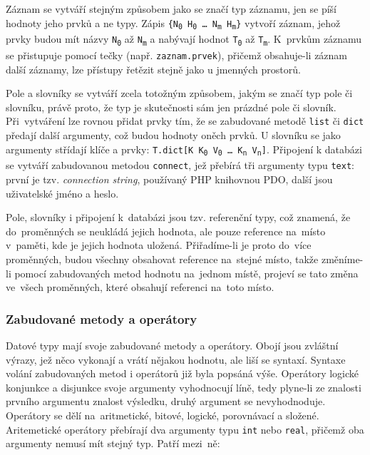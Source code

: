 \documentclass[a4paper,12pt]{article}
\begin{document}
Záznam se vytváří stejným způsobem jako se značí typ záznamu, jen se píší hodnoty jeho prvků a ne typy. Zápis \texttt{\{N\textsubscript{0} H\textsubscript{0} \ldots{} N\textsubscript{m} H\textsubscript{m}\}} vytvoří záznam, jehož prvky budou mít názvy \texttt{N\textsubscript{0}} až \texttt{N\textsubscript{m}} a nabývají hodnot \texttt{T\textsubscript{0}} až \texttt{T\textsubscript{m}}. K~prvkům záznamu se přistupuje pomocí tečky (např. \texttt{zaznam.prvek}), přičemž obsahuje-li záznam další záznamy, lze přístupy řetězit stejně jako u jmenných prostorů.

Pole a slovníky se vytváří zcela totožným způsobem, jakým se značí typ pole či slovníku, právě proto, že typ je skutečnosti sám jen prázdné pole či slovník. Při~vytváření lze rovnou přidat prvky tím, že se zabudované metodě \texttt{list} či \texttt{dict} předají další argumenty, což budou hodnoty oněch prvků. U slovníku se jako argumenty střídají klíče a prvky: \texttt{T.dict[K K\textsubscript{0} V\textsubscript{0} \ldots{} K\textsubscript{n} V\textsubscript{n}]}. Připojení k databázi se vytváří zabudovanou metodou \texttt{connect}, jež přebírá tři argumenty typu \texttt{text}: první je tzv. \textit{connection string}, používaný PHP knihovnou PDO, další jsou uživatelské jméno a heslo.

Pole, slovníky i připojení k~databázi jsou tzv. referenční typy, což znamená, že do~proměnných se neukládá jejich hodnota, ale pouze reference na~místo v~paměti, kde je jejich hodnota uložená. Přiřadíme-li je proto do~více proměnných, budou všechny obsahovat reference na~stejné místo, takže změníme-li pomocí zabudovaných metod hodnotu na~jednom místě, projeví se tato změna ve~všech proměnných, které obsahují referenci na~toto místo.

\subsubsection{Zabudované metody a operátory}
Datové typy mají svoje zabudované metody a operátory. Obojí jsou zvláštní výrazy, jež něco vykonají a vrátí nějakou hodnotu, ale liší se syntaxí. Syntaxe volání zabudovaných metod i operátorů již byla popsáná výše. Operátory logické konjunkce a disjunkce svoje argumenty vyhodnocují líně, tedy plyne-li ze znalosti prvního argumentu znalost výsledku, druhý argument se nevyhodnoduje. Operátory se dělí na~aritmetické, bitové, logické, porovnávací a složené. Aritemetické operátory přebírají dva argumenty typu \texttt{int} nebo \texttt{real}, přičemž oba argumenty nemusí mít stejný typ. Patří mezi~ně:
\end{document}
